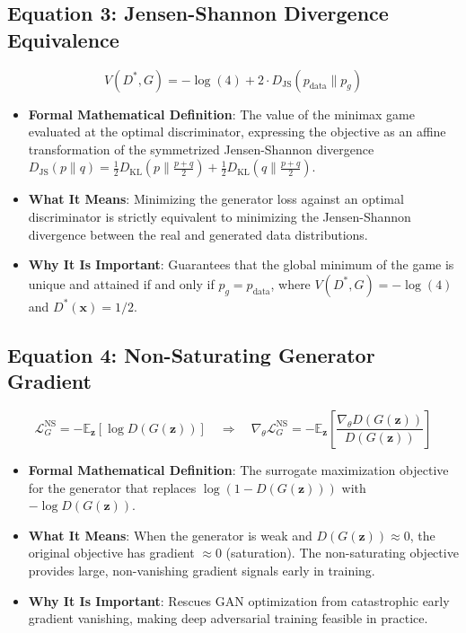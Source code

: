 \documentclass[11pt,a4paper]{article}
\theoremstyle{definition}
\begin{document}
\subsection{\textbf{Equation 3: Jensen-Shannon Divergence Equivalence}}
{\boldmath
\begin{equation}
V(D^*, G) = -\log(4) + 2 \cdot D_{\text{JS}}(p_{\text{data}} \parallel p_g)
\end{equation}
}
\begin{itemize}
    \item \textbf{Formal Mathematical Definition}:
    The value of the minimax game evaluated at the optimal discriminator, expressing the objective as an affine transformation of the symmetrized Jensen-Shannon divergence $D_{\text{JS}}(p \parallel q) = \frac{1}{2} D_{\text{KL}}(p \parallel \frac{p+q}{2}) + \frac{1}{2} D_{\text{KL}}(q \parallel \frac{p+q}{2})$.
    \item \textbf{What It Means}:
    Minimizing the generator loss against an optimal discriminator is strictly equivalent to minimizing the Jensen-Shannon divergence between the real and generated data distributions.
    \item \textbf{Why It Is Important}:
    Guarantees that the global minimum of the game is unique and attained if and only if $p_g = p_{\text{data}}$, where $V(D^*, G) = -\log(4)$ and $D^*(\mathbf{x}) = 1/2$.
\end{itemize}

\subsection{\textbf{Equation 4: Non-Saturating Generator Gradient}}
{\boldmath
\begin{equation}
\mathcal{L}_G^{\text{NS}} = -\mathbb{E}_{\mathbf{z}}[\log D(G(\mathbf{z}))] \quad \Longrightarrow \quad \nabla_\theta \mathcal{L}_G^{\text{NS}} = -\mathbb{E}_{\mathbf{z}}\left[ \frac{\nabla_\theta D(G(\mathbf{z}))}{D(G(\mathbf{z}))} \right]
\end{equation}
}
\begin{itemize}
    \item \textbf{Formal Mathematical Definition}:
    The surrogate maximization objective for the generator that replaces $\log(1 - D(G(\mathbf{z})))$ with $-\log D(G(\mathbf{z}))$.
    \item \textbf{What It Means}:
    When the generator is weak and $D(G(\mathbf{z})) \approx 0$, the original objective has gradient $\approx 0$ (saturation). The non-saturating objective provides large, non-vanishing gradient signals early in training.
    \item \textbf{Why It Is Important}:
    Rescues GAN optimization from catastrophic early gradient vanishing, making deep adversarial training feasible in practice.
\end{itemize}
\end{document}
